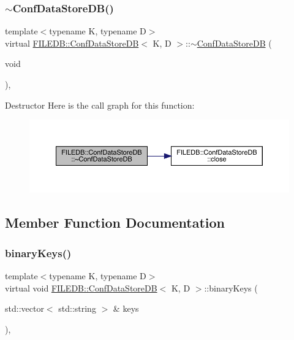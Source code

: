 \subsubsection{\texorpdfstring{$\sim$ConfDataStoreDB()}{~ConfDataStoreDB()}\hspace{0.1cm}{\footnotesize\ttfamily [2/2]}}
{\footnotesize\ttfamily template$<$typename K, typename D$>$ \\
virtual \mbox{\hyperlink{classFILEDB_1_1ConfDataStoreDB}{F\+I\+L\+E\+D\+B\+::\+Conf\+Data\+Store\+DB}}$<$ K, D $>$\+::$\sim$\mbox{\hyperlink{classFILEDB_1_1ConfDataStoreDB}{Conf\+Data\+Store\+DB}} (\begin{DoxyParamCaption}\item[{void}]{ }\end{DoxyParamCaption})\hspace{0.3cm}{\ttfamily [inline]}, {\ttfamily [virtual]}}

Destructor Here is the call graph for this function\+:
\nopagebreak
\begin{figure}[H]
\begin{center}
\leavevmode
\includegraphics[width=350pt]{d8/d19/classFILEDB_1_1ConfDataStoreDB_a39b48750dbc9bd0d4ca8c9787edee897_cgraph}
\end{center}
\end{figure}


\subsection{Member Function Documentation}
\mbox{\label{classFILEDB_1_1ConfDataStoreDB_a1d0e8e27cd8fc6b24ece52259d1ab2b0}} 
\subsubsection{\texorpdfstring{binaryKeys()}{binaryKeys()}\hspace{0.1cm}{\footnotesize\ttfamily [1/2]}}
{\footnotesize\ttfamily template$<$typename K, typename D$>$ \\
virtual void \mbox{\hyperlink{classFILEDB_1_1ConfDataStoreDB}{F\+I\+L\+E\+D\+B\+::\+Conf\+Data\+Store\+DB}}$<$ K, D $>$\+::binary\+Keys (\begin{DoxyParamCaption}\item[{std\+::vector$<$ std\+::string $>$ \&}]{keys }\end{DoxyParamCaption})\hspace{0.3cm}{\ttfamily [inline]}, {\ttfamily [virtual]}}

